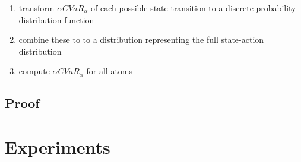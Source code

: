 \begin{enumerate}
\item transform $\alpha CVaR_\alpha$ of each possible state transition to a discrete probability distribution function
\item combine these to to a distribution representing the full state-action distribution
\item compute $\alpha CVaR_\alpha$ for all atoms
\end{enumerate}




%
%
%
%


\subsection{Proof}


\section{Experiments}



